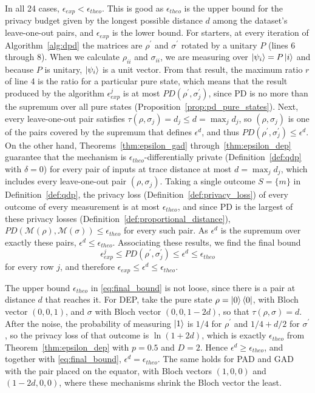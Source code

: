 \documentclass{ieeeaccess}
\begin{document}
In all 24 cases, $\epsilon_{exp} < \epsilon_{theo}$. This is good as $\epsilon_{theo}$ is the upper bound for the privacy budget given by the longest possible distance $d$ among the dataset's leave-one-out pairs, and $\epsilon_{exp}$ is the lower bound. For starters, at every iteration of Algorithm~\ref{alg:dpd} the matrices are $\rho^{\prime}$ and $\sigma^{\prime}$ rotated by a unitary $P$ (lines 6 through 8). When we calculate $\rho_{ii}$ and $\sigma_{ii}$, we are measuring over $\ket{\psi_i} = P\ket{i}$ and because $P$ is unitary, $\ket{\psi_i}$ is a unit vector. From that result, the maximum ratio $r$ of line 4 is the ratio for a particular pure state, which means that the result produced by the algorithm $\epsilon_{exp}^{j}$ is at most $PD(\rho^{\prime}, \sigma_{j}^{\prime})$, since PD is no more than the supremum over all pure states (Proposition~\ref{prop:pd_pure_states}). Next, every leave-one-out pair satisfies $\tau(\rho, \sigma_j) = d_j \leq d = \max_j d_j$, so $(\rho, \sigma_j)$ is one of the pairs covered by the supremum that defines $\epsilon^{d}$, and thus $PD(\rho^{\prime}, \sigma_{j}^{\prime}) \leq \epsilon^{d}$. On the other hand, Theorems~\ref{thm:epsilon_gad} through~\ref{thm:epsilon_dep} guarantee that the mechanism is $\epsilon_{theo}$-differentially private (Definition~\ref{def:qdp} with $\delta = 0$) for every pair of inputs at trace distance at most $d = \max_j d_j$, which includes every leave-one-out pair $(\rho, \sigma_j)$. Taking a single outcome $S = \{m\}$ in Definition~\ref{def:qdp}, the privacy loss (Definition~\ref{def:privacy_loss}) of every outcome of every measurement is at most $\epsilon_{theo}$, and since PD is the largest of these privacy losses (Definition~\ref{def:proportional_distance}), $PD(\mathcal{M}(\rho), \mathcal{M}(\sigma)) \leq \epsilon_{theo}$ for every such pair. As $\epsilon^{d}$ is the supremum over exactly these pairs, $\epsilon^{d} \leq \epsilon_{theo}$. Associating these results, we find the final bound
\begin{equation}
  \epsilon_{exp}^{j} \leq PD(\rho^{\prime}, \sigma_{j}^{\prime}) \leq \epsilon^{d} \leq \epsilon_{theo}
  \label{eq:final_bound}
\end{equation}
for every row $j$, and therefore $\epsilon_{exp} \leq \epsilon^{d}\leq \epsilon_{theo}$.

The upper bound $\epsilon_{theo}$ in \eqref{eq:final_bound} is not loose, since there is a pair at distance $d$ that reaches it. For DEP, take the pure state $\rho = \ket{0}\bra{0}$, with Bloch vector $(0, 0, 1)$, and $\sigma$ with Bloch vector $(0, 0, 1-2d)$, so that $\tau(\rho, \sigma) = d$. After the noise, the probability of measuring $\ket{1}$ is $1/4$ for $\rho^{\prime}$ and $1/4 + d/2$ for $\sigma^{\prime}$, so the privacy loss of that outcome is $\ln(1 + 2d)$, which is exactly $\epsilon_{theo}$ from Theorem~\ref{thm:epsilon_dep} with $p = 0.5$ and $D = 2$. Hence $\epsilon^{d} \geq \epsilon_{theo}$, and together with \eqref{eq:final_bound}, $\epsilon^{d} = \epsilon_{theo}$. The same holds for PAD and GAD with the pair placed on the equator, with Bloch vectors $(1, 0, 0)$ and $(1-2d, 0, 0)$, where these mechanisms shrink the Bloch vector the least.
\end{document}
